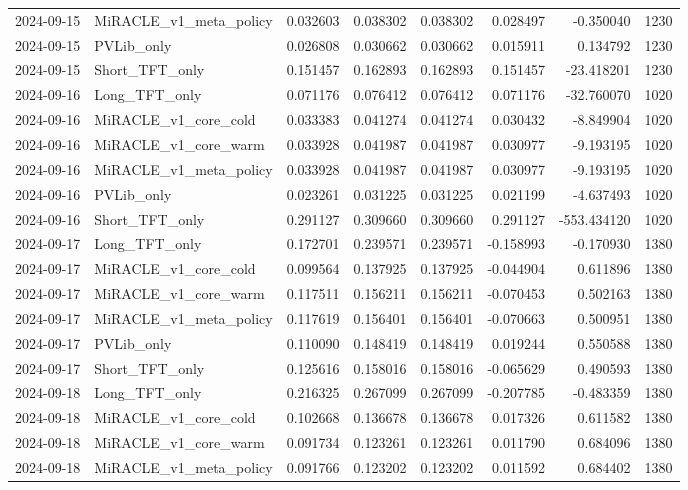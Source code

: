 \begin{tabular}{llrrrrrr}
2024-09-15 & MiRACLE_v1_meta_policy & 0.032603 & 0.038302 & 0.038302 & 0.028497 & -0.350040 & 1230 \\
2024-09-15 & PVLib_only & 0.026808 & 0.030662 & 0.030662 & 0.015911 & 0.134792 & 1230 \\
2024-09-15 & Short_TFT_only & 0.151457 & 0.162893 & 0.162893 & 0.151457 & -23.418201 & 1230 \\
2024-09-16 & Long_TFT_only & 0.071176 & 0.076412 & 0.076412 & 0.071176 & -32.760070 & 1020 \\
2024-09-16 & MiRACLE_v1_core_cold & 0.033383 & 0.041274 & 0.041274 & 0.030432 & -8.849904 & 1020 \\
2024-09-16 & MiRACLE_v1_core_warm & 0.033928 & 0.041987 & 0.041987 & 0.030977 & -9.193195 & 1020 \\
2024-09-16 & MiRACLE_v1_meta_policy & 0.033928 & 0.041987 & 0.041987 & 0.030977 & -9.193195 & 1020 \\
2024-09-16 & PVLib_only & 0.023261 & 0.031225 & 0.031225 & 0.021199 & -4.637493 & 1020 \\
2024-09-16 & Short_TFT_only & 0.291127 & 0.309660 & 0.309660 & 0.291127 & -553.434120 & 1020 \\
2024-09-17 & Long_TFT_only & 0.172701 & 0.239571 & 0.239571 & -0.158993 & -0.170930 & 1380 \\
2024-09-17 & MiRACLE_v1_core_cold & 0.099564 & 0.137925 & 0.137925 & -0.044904 & 0.611896 & 1380 \\
2024-09-17 & MiRACLE_v1_core_warm & 0.117511 & 0.156211 & 0.156211 & -0.070453 & 0.502163 & 1380 \\
2024-09-17 & MiRACLE_v1_meta_policy & 0.117619 & 0.156401 & 0.156401 & -0.070663 & 0.500951 & 1380 \\
2024-09-17 & PVLib_only & 0.110090 & 0.148419 & 0.148419 & 0.019244 & 0.550588 & 1380 \\
2024-09-17 & Short_TFT_only & 0.125616 & 0.158016 & 0.158016 & -0.065629 & 0.490593 & 1380 \\
2024-09-18 & Long_TFT_only & 0.216325 & 0.267099 & 0.267099 & -0.207785 & -0.483359 & 1380 \\
2024-09-18 & MiRACLE_v1_core_cold & 0.102668 & 0.136678 & 0.136678 & 0.017326 & 0.611582 & 1380 \\
2024-09-18 & MiRACLE_v1_core_warm & 0.091734 & 0.123261 & 0.123261 & 0.011790 & 0.684096 & 1380 \\
2024-09-18 & MiRACLE_v1_meta_policy & 0.091766 & 0.123202 & 0.123202 & 0.011592 & 0.684402 & 1380 \\

\end{tabular}
